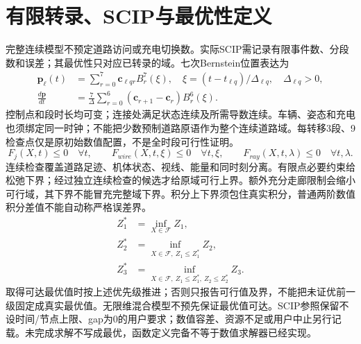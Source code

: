 \section{有限转录、SCIP与最优性定义}
\noindent 完整连续模型不预定道路访问或充电切换数。实际SCIP需记录有限事件数、分段数和误差；其最优性只对应已转录的域。七次Bernstein位置表达为
\begin{align}
 \mathbf p_\ell(t)&=\sum_{r=0}^7\mathbf c_{\ell qr}B_r^7(\xi),\quad
 \xi=(t-t_{\ell q})/\Delta_{\ell q},\quad \Delta_{\ell q}>0,\label{eng:eq:polynomial}\\
 \frac{d\mathbf p}{dt}&=\frac7\Delta\sum_{r=0}^6
                  (\mathbf c_{r+1}-\mathbf c_r)B_r^6(\xi).
\end{align}
\noindent 控制点和段时长均可变；连接处满足状态连续及所需导数连续。车辆、姿态和充电也须绑定同一时钟；不能把少数预制道路原语作为整个连续道路域。每转移3段、9检查点仅是原初始数值配置，不是全时段可行性证明。
\begin{equation}
 F_j(X,t)\le0\quad\forall t,\qquad
 F_{wire}(X,t,\xi)\le0\quad\forall t,\xi,\qquad
 F_{ray}(X,t,\lambda)\le0\quad\forall t,\lambda.
 \label{eng:eq:forall}
\end{equation}
\noindent 连续检查覆盖道路足迹、机体状态、视线、能量和同时刻分离。有限点必要约束给松弛下界；经过独立连续检查的候选才给原域可行上界。额外充分走廊限制会缩小可行域，其下界不能冒充完整域下界。积分上下界须包住真实积分，普通两阶数值积分差值不能自动称严格误差界。
\begin{align}
 Z_1^*&=\inf_{X\in\mathcal F}Z_1,\\
 Z_2^*&=\inf_{X\in\mathcal F,\ Z_1\le Z_1^*}Z_2,\\
 Z_3^*&=\inf_{X\in\mathcal F,\ Z_1\le Z_1^*,\ Z_2\le Z_2^*}Z_3.
 \label{eng:eq:lexpasses}
\end{align}
\noindent 取得可达最优值时按上述优先级推进；否则只报告可行值及界，不能把未证优前一级固定成真实最优值。无限维混合模型不预先保证最优值可达。SCIP参照保留不设时间/节点上限、gap为0的用户要求；数值容差、资源不足或用户中止另行记载。未完成求解不写成最优，函数定义完备不等于数值求解器已经实现。
\clearpage


